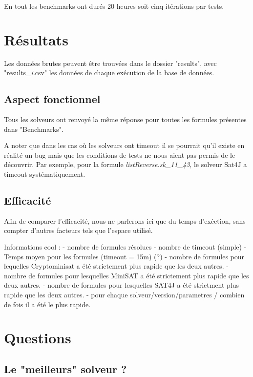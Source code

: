 \documentclass[11pt,a4paper]{article}
\begin{document}
En tout les benchmarks ont durés 20 heures soit cinq itérations par tests.


\section{Résultats}

Les données brutes peuvent être trouvées dans le dossier "results", avec "results\_\textit{i}.csv" les données de chaque exécution de la base de données.

\subsection{Aspect fonctionnel}

Tous les solveurs ont renvoyé la même réponse pour toutes les formules présentes dans "Benchmarks".

A noter que dans les cas où les solveurs ont timeout il se pourrait qu'il existe en réalité un bug mais que les conditions de tests ne nous aient pas permis de le découvrir. Par exemple, pour
la formule \textit{listReverse.sk\_11\_43}, le solveur Sat4J a timeout systématiquement.

\subsection{Efficacité}

Afin de comparer l'efficacité, nous ne parlerons ici que du temps d'exéction, sans compter d'autres facteurs tels que l'espace utilisé.

Informations cool : 
- nombre de formules résolues
- nombre de timeout (simple)
- Temps moyen pour les formules (timeout = 15m) (?)
- nombre de formules pour lequelles Cryptominisat a été strictement plus rapide que les deux autres.
- nombre de formules pour lesquelles MiniSAT a été strictement plus rapide que les deux autres.
- nombre de formules pour lesquelles SAT4J a été strictment plus rapide que les deux autres.
- pour chaque solveur/version/parametres / combien de fois il a été le plus rapide.


\section{Questions}

\subsection{Le "meilleurs" solveur ?}
\end{document}
